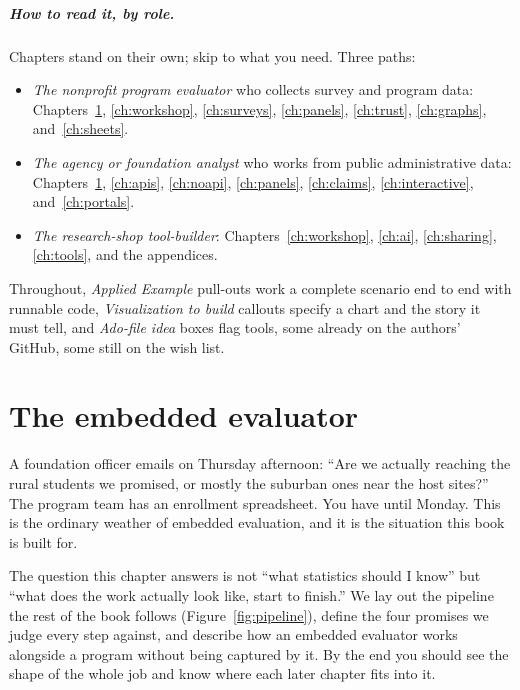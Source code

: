 \documentclass[
    a4paper,
    fontsize=10pt,
    twoside=true,
    numbers=noenddot,
]{kaobook}
\begin{document}
\paragraph{How to read it, by role.} Chapters stand on their own; skip to what you need. Three paths:
\begin{itemize}
    \item \emph{The nonprofit program evaluator} who collects survey and program data: Chapters~\ref{ch:embedded}, \ref{ch:workshop}, \ref{ch:surveys}, \ref{ch:panels}, \ref{ch:trust}, \ref{ch:graphs}, and~\ref{ch:sheets}.
    \item \emph{The agency or foundation analyst} who works from public administrative data: Chapters~\ref{ch:embedded}, \ref{ch:apis}, \ref{ch:noapi}, \ref{ch:panels}, \ref{ch:claims}, \ref{ch:interactive}, and~\ref{ch:portals}.
    \item \emph{The research-shop tool-builder}: Chapters~\ref{ch:workshop}, \ref{ch:ai}, \ref{ch:sharing}, \ref{ch:tools}, and the appendices.
\end{itemize}
Throughout, \emph{Applied Example} pull-outs work a complete scenario end to end with runnable code, \emph{Visualization to build} callouts specify a chart and the story it must tell, and \emph{Ado-file idea} boxes flag tools, some already on the authors' GitHub, some still on the wish list.



\chapter{The embedded evaluator}\label{ch:embedded}

A foundation officer emails on Thursday afternoon: \enquote{Are we actually reaching the rural students we promised, or mostly the suburban ones near the host sites?} The program team has an enrollment spreadsheet. You have until Monday. This is the ordinary weather of embedded evaluation, and it is the situation this book is built for.

The question this chapter answers is not \enquote{what statistics should I know} but \enquote{what does the work actually look like, start to finish.} We lay out the pipeline the rest of the book follows (Figure~\ref{fig:pipeline}), define the four promises we judge every step against, and describe how an embedded evaluator works alongside a program without being captured by it. By the end you should see the shape of the whole job and know where each later chapter fits into it.
\end{document}
